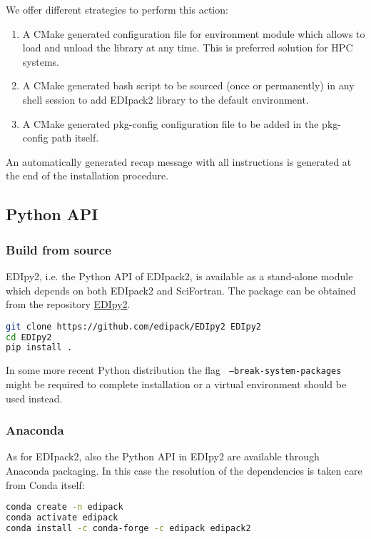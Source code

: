 \documentclass[final,3p,10pt]{elsarticle}
\def\NAME{{\rm EDIpack2 }}
\begin{document}
We offer different strategies to perform this action:
\begin{enumerate}
\item  A CMake generated configuration file for environment module
  which allows to load and unload the library at any time. This is
  preferred solution for HPC systems. 
\item A CMake generated bash script to be sourced (once or
  permanently) in any shell session to add \NAME library to the
  default environment.
\item A CMake generated pkg-config configuration file to be added in
  the pkg-config path itself.  
\end{enumerate}
An automatically generated recap message with all instructions is
generated at the end of the installation procedure. 



\subsection{Python API}
\subsubsection{Build from source}
EDIpy2, i.e. the Python API of EDIpack2, is available as a stand-alone
module which depends on both \NAME and SciFortran. The package can be
obtained from the repository
\href{https://github.com/EDIpack/EDIpy2.0}{EDIpy2}.

\begin{lstlisting}[language=Bash]
git clone https://github.com/edipack/EDIpy2 EDIpy2
cd EDIpy2
pip install . 
\end{lstlisting}
In some more recent Python distribution the flag {\tt
  --break-system-packages} might be required to complete
installation or a virtual environment should be used instead. 

\subsubsection{Anaconda}
As for EDIpack2, also the Python API in EDIpy2 are available through
Anaconda packaging. In this case the resolution of the dependencies is
taken care from Conda itself:

\begin{lstlisting}[language=Bash]
conda create -n edipack
conda activate edipack
conda install -c conda-forge -c edipack edipack2
\end{lstlisting}
\end{document}
